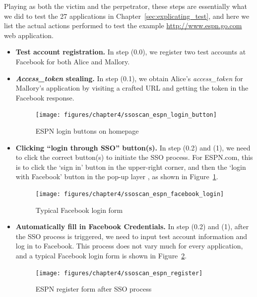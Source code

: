 Playing as both the victim and the perpetrator, these steps are essentially what we did to test the 27 applications in Chapter~\ref{sec:explicating_test}, and here we list the actual actions performed to test the example \url{http://www.espn.go.com} web application.  

\begin{itemize}

\item \textbf{Test account registration.}  In step (0.0), we register two test accounts at Facebook for both Alice and Mallory.

\item \textbf{\emph{Access\_token} stealing.}  In step (0.1), we obtain Alice's \emph{access\_token} for Mallory's application by visiting a crafted URL and getting the token in the Facebook response.

\begin{figure}[hbt]
\centering
\texttt{[image: figures/chapter4/ssoscan\_espn\_login\_button]}
\caption{ESPN login buttons on homepage}
\label{fig:ssoscan_espn_login_button}
\end{figure}

\item \textbf{Clicking ``login through SSO'' button(s).}  In step (0.2) and (1), we need to click the correct button(s) to initiate the SSO process.  For ESPN.com, this is to click the `sign in' button in the upper-right corner, and then the `login with Facebook' button in the pop-up layer , as shown in Figure~\ref{fig:ssoscan_espn_login_button}.

\begin{figure}[bht]
\centering
\texttt{[image: figures/chapter4/ssoscan\_espn\_facebook\_login]}
\caption{Typical Facebook login form}
\label{fig:ssoscan_espn_facebook_login}
\end{figure}

\item \textbf{Automatically fill in Facebook Credentials.}  In step (0.2) and (1), after the SSO process is triggered, we need to input test account information and log in to Facebook.  This process does not vary much for every application, and a typical Facebook login form is shown in Figure~\ref{fig:ssoscan_espn_facebook_login}.

\begin{figure}[hbt]
\centering
\texttt{[image: figures/chapter4/ssoscan\_espn\_register]}
\caption{ESPN register form after SSO process}
\label{fig:ssoscan_espn_register}
\end{figure}


\end{itemize}
